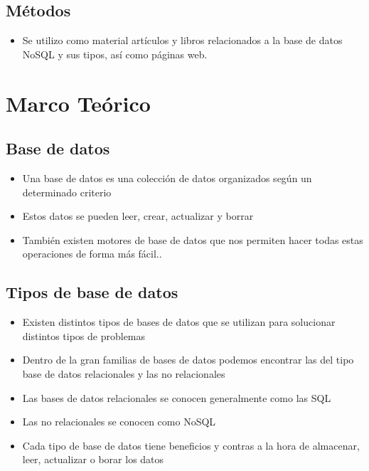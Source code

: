 \documentclass[%
 reprint,
 amsmath,amssymb,
 aps,
]{revtex4-1}
\begin{document}
\subsection{Métodos}
	\begin{itemize}
		\item Se utilizo como material artículos y libros relacionados a la base de datos NoSQL y sus tipos, así como páginas web.
	\end{itemize}
\section{Marco Teórico}\label{sec:3}
\subsection{Base de datos}
	          \begin{itemize}
		\item Una base de datos es una colección de datos organizados según un determinado criterio
		\item Estos datos se pueden leer, crear, actualizar y borrar
		\item También existen motores de base de datos que nos permiten hacer todas estas operaciones de forma más fácil..\cite{Nicolas}
	          \end{itemize}
\subsection{Tipos de base de datos}
	          \begin{itemize}
		\item Existen distintos tipos de bases de datos que se utilizan para solucionar distintos tipos de problemas
                     \item Dentro de la gran familias de bases de datos podemos encontrar las del tipo base de datos relacionales y las no relacionales
		\item Las bases de datos relacionales se conocen generalmente como las SQL
		\item Las no relacionales se conocen como NoSQL
		\item Cada tipo de base de datos tiene beneficios y contras a la hora de almacenar, leer, actualizar o borar los datos
	           \end{itemize}
\end{document}
